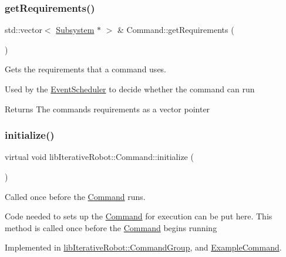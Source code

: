\subsubsection{\texorpdfstring{getRequirements()}{getRequirements()}}
{\footnotesize\ttfamily std\+::vector$<$ \mbox{\hyperlink{classlib_iterative_robot_1_1_subsystem}{Subsystem}} $\ast$ $>$ \& Command\+::get\+Requirements (\begin{DoxyParamCaption}{ }\end{DoxyParamCaption})\hspace{0.3cm}{\ttfamily [protected]}}



Gets the requirements that a command uses. 

Used by the \mbox{\hyperlink{classlib_iterative_robot_1_1_event_scheduler}{Event\+Scheduler}} to decide whether the command can run

\begin{DoxyReturn}{Returns}
The command\textquotesingle{}s requirements as a vector pointer 
\end{DoxyReturn}
\mbox{\label{classlib_iterative_robot_1_1_command_a14543c9d38b07e52f9ffb2af88a63f60}} 
\subsubsection{\texorpdfstring{initialize()}{initialize()}}
{\footnotesize\ttfamily virtual void lib\+Iterative\+Robot\+::\+Command\+::initialize (\begin{DoxyParamCaption}{ }\end{DoxyParamCaption})\hspace{0.3cm}{\ttfamily [pure virtual]}}



Called once before the \mbox{\hyperlink{classlib_iterative_robot_1_1_command}{Command}} runs. 

Code needed to sets up the \mbox{\hyperlink{classlib_iterative_robot_1_1_command}{Command}} for execution can be put here. This method is called once before the \mbox{\hyperlink{classlib_iterative_robot_1_1_command}{Command}} begins running 

Implemented in \mbox{\hyperlink{classlib_iterative_robot_1_1_command_group_a99800c5dbd05ab750aa0bb27518d0467}{lib\+Iterative\+Robot\+::\+Command\+Group}}, and \mbox{\hyperlink{class_example_command_ae7bea17127c1697acbf90d6022eb5b5d}{Example\+Command}}.

